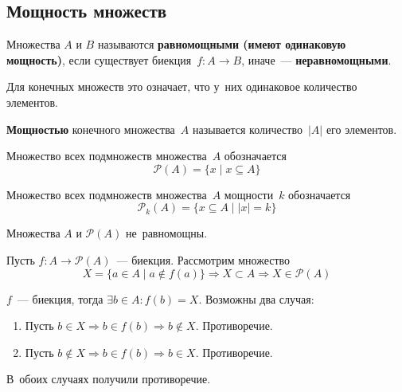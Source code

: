 \subsection{Мощность множеств}
\begin{definition}
	Множества $A$ и $B$ называются \textbf{равномощными (имеют одинаковую мощность)}, если существует биекция~$f \colon A \to B$, иначе~--- \textbf{неравномощными}.
	
	Для конечных множеств это означает, что у~них одинаковое количество элементов.
\end{definition}

\begin{definition}
	\textbf{Мощностью} конечного множества~$A$ называется количество~$|A|$ его элементов.
\end{definition}
	
	Множество всех подмножеств множества~$A$ обозначается
	\[ \mathcal P(A) = \{ x \mid x \subseteq A \} \]
	
	Множество всех подмножеств множества~$A$ мощности~$k$ обозначается
	\[ \mathcal P_k(A) = \{ x \subseteq A \mid |x| = k \} \]
	
\begin{theorem}[Кантора]
	Множества $A$ и $\mathcal P(A)$ не~равномощны.
\end{theorem}
\begin{proofcontra}
	Пусть $f \colon A \to \mathcal P(A)$~--- биекция. Рассмотрим множество
	\[ X = \{ a \in A \mid a \notin f(a) \} \Rightarrow X \subset A \Rightarrow X \in \mathcal P(A) \]
	
	$f$~--- биекция, тогда $\exists b \in A \colon f(b) = X$.
	Возможны два случая:
\begin{enumerate}
	\item Пусть $b \in X \Rightarrow b \in f(b) \Rightarrow b \notin X$.
	Противоречие.
	\item Пусть $b \notin X \Rightarrow b \in f(b) \Rightarrow b \in X$.
	Противоречие.
\end{enumerate}

	В~обоих случаях получили противоречие.
\end{proofcontra}

